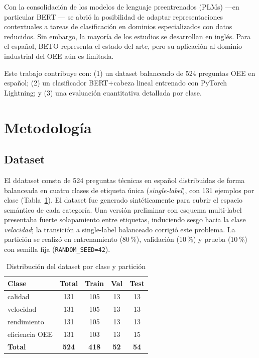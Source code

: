 \documentclass[conference]{IEEEtran}
\begin{document}
Con la consolidación de los modelos de lenguaje preentrenados (PLMs) —en
particular BERT \cite{devlin2019bert}— se abrió la posibilidad de adaptar
representaciones contextuales a tareas de clasificación en dominios
especializados con datos reducidos. Sin embargo, la mayoría de los estudios
se desarrollan en inglés. Para el español, BETO \cite{canete2020spanish}
representa el estado del arte, pero su aplicación al dominio industrial del
OEE aún es limitada.

Este trabajo contribuye con: (1) un dataset balanceado de 524 preguntas
OEE en español; (2) un clasificador BERT+cabeza lineal entrenado con
PyTorch Lightning; y (3) una evaluación cuantitativa detallada por clase.

\section{Metodología}

\subsection{Dataset}

El ddataset consta de 524 preguntas técnicas en español distribuidas
de forma balanceada en cuatro clases de etiqueta única (\textit{single-label}),
con 131 ejemplos por clase (Tabla~\ref{tab:dataset}).
El dataset fue generado sintéticamente para cubrir el espacio semántico de cada
categoría. Una versión preliminar con esquema multi-label presentaba fuerte
solapamiento entre etiquetas, induciendo sesgo hacia la clase \textit{velocidad};
la transición a single-label balanceado corrigió este problema.
La partición se realizó en entrenamiento (80\,\%), validación (10\,\%) y
prueba (10\,\%) con semilla fija (\texttt{RANDOM\_SEED=42}).

\begin{table}[h]
\centering
\caption{Distribución del dataset por clase y partición}
\label{tab:dataset}
\begin{tabular}{lcccc}
\toprule
\textbf{Clase} & \textbf{Total} & \textbf{Train} & \textbf{Val} & \textbf{Test} \\
\midrule
calidad        & 131 & 105 & 13 & 13 \\
velocidad      & 131 & 105 & 13 & 13 \\
rendimiento    & 131 & 105 & 13 & 13 \\
eficiencia OEE & 131 & 103 & 13 & 15 \\
\midrule
\textbf{Total} & \textbf{524} & \textbf{418} & \textbf{52} & \textbf{54} \\
\bottomrule
\end{tabular}
\end{table}
\end{document}

